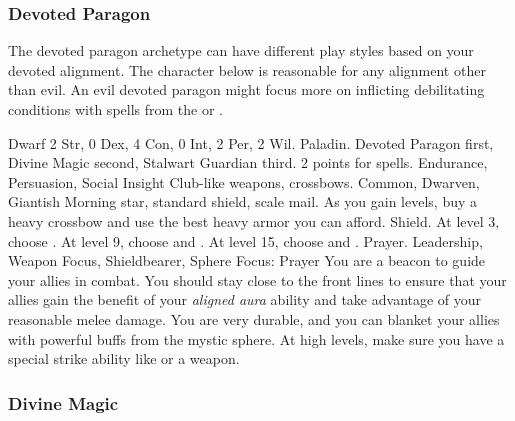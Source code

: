         \subsubsection{Devoted Paragon}
            The devoted paragon archetype can have different play styles based on your devoted alignment.
            The character below is reasonable for any alignment other than evil.
            An evil devoted paragon might focus more on inflicting debilitating conditions with spells from the  or  .

             Dwarf
             2 Str, 0 Dex, 4 Con, 0 Int, 2 Per, 2 Wil.
             Paladin.
             Devoted Paragon first, Divine Magic second, Stalwart Guardian third.
             2 points for spells.
             Endurance, Persuasion, Social Insight
             Club-like weapons, crossbows.
             Common, Dwarven, Giantish
             Morning star, standard shield, scale mail. As you gain levels, buy a heavy crossbow and use the best heavy armor you can afford.
             Shield.
                At level 3, choose .
                At level 9, choose  and .
                At level 15, choose  and .
             Prayer.
             Leadership, Weapon Focus, Shieldbearer, Sphere Focus: Prayer
             You are a beacon to guide your allies in combat.
            You should stay close to the front lines to ensure that your allies gain the benefit of your \textit{aligned aura} ability and take advantage of your reasonable melee damage.
            You are very durable, and you can blanket your allies with powerful buffs from the  mystic sphere.
            At high levels, make sure you have a special strike ability like  or a  weapon.

        \subsubsection{Divine Magic}

